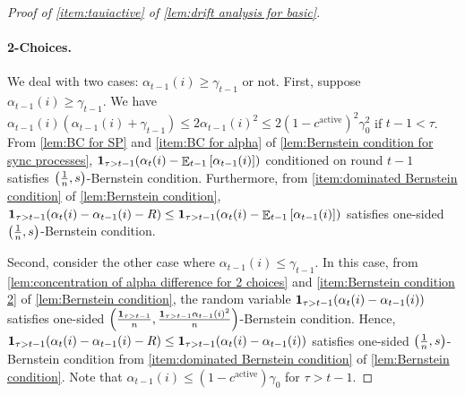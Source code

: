 \documentclass[letterpaper,11pt]{article}
\newcommand{\indicator}{\mathbf{1}}
\DeclareMathOperator*{\E}{\mathbb{E}}
\newcommand{\alphanorm}{\gamma}
\newcommand{\variance}{s}
\newcommand{\cactive}{c^{\mathrm{active}}}
\begin{document}
\begin{proof}[Proof of \cref{item:tauiactive} of \cref{lem:drift analysis for basic}]
    \paragraph*{2-Choices.}
    We deal with two cases: $\alpha_{t-1}(i)\geq \alphanorm_{t-1}$ or not.
    First, suppose $\alpha_{t-1}(i)\geq \alphanorm_{t-1}$.
    We have $\alpha_{t-1}(i)(\alpha_{t-1}(i)+\alphanorm_{t-1})\leq 2\alpha_{t-1}(i)^2\leq 2(1-\cactive)^2\alphanorm_0^2$ if $ t-1 < \tau $.
    From \cref{lem:BC for SP} and \cref{item:BC for alpha} of \cref{lem:Bernstein condition for sync processes}, 
    $\indicator_{\tau>t-1}\qty(\alpha_t(i)-\E_{t-1}\qty[ \alpha_{t-1}(i)])$ conditioned on round $t-1$ satisfies $\qty(\frac{1}{n},\variance)$-Bernstein condition.
    Furthermore, from \cref{item:dominated Bernstein condition} of \cref{lem:Bernstein condition}, $\indicator_{\tau>t-1}\qty(\alpha_t(i)-\alpha_{t-1}(i)-R)\leq \indicator_{\tau>t-1}\qty(\alpha_t(i)-\E_{t-1}\qty[ \alpha_{t-1}(i)])$ satisfies one-sided $\qty(\frac{1}{n},\variance)$-Bernstein condition.
    

    

    Second, consider the other case where $\alpha_{t-1}(i)\leq \alphanorm_{t-1}$.
    In this case, from \cref{lem:concentration of alpha difference for 2 choices} and \cref{item:Bernstein condition 2} of \cref{lem:Bernstein condition}, the random variable $\indicator_{\tau>t-1}\qty(\alpha_t(i)-\alpha_{t-1}(i))$ satisfies one-sided $\qty(\frac{\indicator_{\tau>t-1}}{n},\frac{\indicator_{\tau>t-1}\alpha_{t-1}(i)^2}{n})$-Bernstein condition.
    Hence, $\indicator_{\tau>t-1}\qty(\alpha_t(i)-\alpha_{t-1}(i)-R)\leq \indicator_{\tau>t-1}\qty(\alpha_t(i)-\alpha_{t-1}(i))$ satisfies one-sided $\qty(\frac{1}{n}, \variance)$-Bernstein condition from \cref{item:dominated Bernstein condition} of \cref{lem:Bernstein condition}.
    Note that $\alpha_{t-1}(i)\leq (1-\cactive)\alphanorm_0$ for $\tau>t-1$.


\end{proof}
\end{document}
